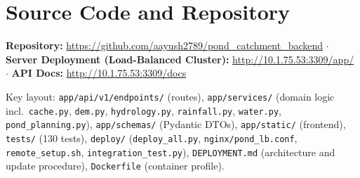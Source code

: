 \documentclass[manuscript,screen,review]{acmart}
\begin{document}
\appendix

\section{Source Code and Repository}
\textbf{Repository:} \url{https://github.com/aayush2789/pond_catchment_backend} $\cdot$ \textbf{Server Deployment (Load-Balanced Cluster):} \url{http://10.1.75.53:3309/app/} $\cdot$ \textbf{API Docs:} \url{http://10.1.75.53:3309/docs}

Key layout: \texttt{app/api/v1/endpoints/} (routes), \texttt{app/services/} (domain logic incl.\ \texttt{cache.py}, \texttt{dem.py}, \texttt{hydrology.py}, \texttt{rainfall.py}, \texttt{water.py}, \texttt{pond\_planning.py}), \texttt{app/schemas/} (Pydantic DTOs), \texttt{app/static/} (frontend), \texttt{tests/} (130 tests), \texttt{deploy/} (\texttt{deploy\_all.py}, \texttt{nginx/pond\_lb.conf}, \texttt{remote\_setup.sh}, \texttt{integration\_test.py}), \texttt{DEPLOYMENT.md} (architecture and update procedure), \texttt{Dockerfile} (container profile).
\end{document}
